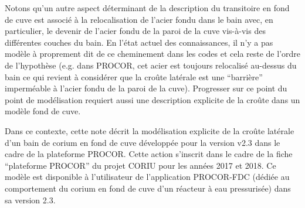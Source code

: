 \begin{remark}
Notons qu'un autre aspect déterminant de la description du transitoire en fond de cuve est associé à la relocalisation de l'acier fondu dans le bain avec, en particulier, le devenir de l'acier fondu de la paroi de la cuve vis-à-vis des différentes couches du bain. En l'état actuel des connaissances, il n'y a pas modèle à proprement dit de ce cheminement dans les codes et cela reste de l'ordre de l'hypothèse (e.g. dans PROCOR, cet acier est toujours relocalisé au-dessus du bain ce qui revient à considérer que la croûte latérale est une ``barrière'' imperméable à l'acier fondu de la paroi de la cuve). Progresser sur ce point du point de modélisation requiert aussi une description explicite de la croûte dans un modèle fond de cuve.
\end{remark}


Dans ce contexte, cette note décrit la modélisation explicite de la croûte latérale d'un bain de corium en fond de cuve développée pour la version v2.3 dans le cadre de la plateforme PROCOR. Cette action s'inscrit dans le cadre de la fiche ``plateforme PROCOR'' du projet CORIU pour les années 2017 et 2018. Ce modèle est disponible à l'utilisateur de l'application PROCOR-FDC (dédiée au comportement du corium en fond de cuve d'un réacteur à eau pressurisée) dans sa version 2.3.

